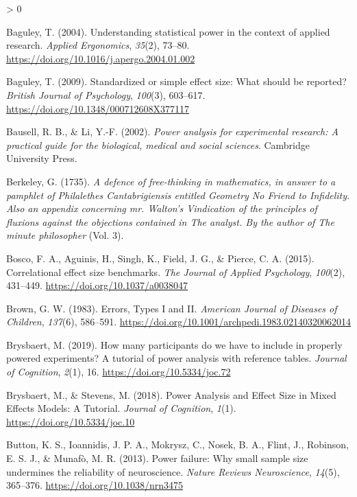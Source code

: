 \documentclass[
  english,
  ,jou, a4paper,floatsintext]{apa6}
\newlength{\cslhangindent}
\newenvironment{CSLReferences}[2] %
 {%
  \setlength{\parindent}{0pt}
  \ifodd #1 \everypar{\setlength{\hangindent}{\cslhangindent}}\ignorespaces\fi
  \ifnum #2 > 0
  \setlength{\parskip}{#2\baselineskip}
  \fi
 }%
 {}
\begin{document}
\begin{CSLReferences}{1}{0}
\leavevmode\hypertarget{ref-baguley_understanding_2004}{}%
Baguley, T. (2004). Understanding statistical power in the context of applied research. \emph{Applied Ergonomics}, \emph{35}(2), 73--80. \url{https://doi.org/10.1016/j.apergo.2004.01.002}

\leavevmode\hypertarget{ref-baguley_standardized_2009}{}%
Baguley, T. (2009). Standardized or simple effect size: What should be reported? \emph{British Journal of Psychology}, \emph{100}(3), 603--617. \url{https://doi.org/10.1348/000712608X377117}

\leavevmode\hypertarget{ref-bausell_power_2002}{}%
Bausell, R. B., \& Li, Y.-F. (2002). \emph{Power analysis for experimental research: A practical guide for the biological, medical and social sciences}. {Cambridge University Press}.

\leavevmode\hypertarget{ref-berkeley_defence_1735}{}%
Berkeley, G. (1735). \emph{A defence of free-thinking in mathematics, in answer to a pamphlet of {Philalethes Cantabrigiensis} entitled {Geometry No Friend} to {Infidelity}. {Also} an appendix concerning mr. {Walton}'s {Vindication} of the principles of fluxions against the objections contained in {The} analyst. {By} the author of {The} minute philosopher} (Vol. 3).

\leavevmode\hypertarget{ref-bosco_correlational_2015}{}%
Bosco, F. A., Aguinis, H., Singh, K., Field, J. G., \& Pierce, C. A. (2015). Correlational effect size benchmarks. \emph{The Journal of Applied Psychology}, \emph{100}(2), 431--449. \url{https://doi.org/10.1037/a0038047}

\leavevmode\hypertarget{ref-brown_errors_1983}{}%
Brown, G. W. (1983). Errors, {Types I} and {II}. \emph{American Journal of Diseases of Children}, \emph{137}(6), 586--591. \url{https://doi.org/10.1001/archpedi.1983.02140320062014}

\leavevmode\hypertarget{ref-brysbaert_how_2019-1}{}%
Brysbaert, M. (2019). How many participants do we have to include in properly powered experiments? A tutorial of power analysis with reference tables. \emph{Journal of Cognition}, \emph{2}(1), 16. \url{https://doi.org/10.5334/joc.72}

\leavevmode\hypertarget{ref-brysbaert_power_2018}{}%
Brysbaert, M., \& Stevens, M. (2018). Power {Analysis} and {Effect Size} in {Mixed Effects Models}: A {Tutorial}. \emph{Journal of Cognition}, \emph{1}(1). \url{https://doi.org/10.5334/joc.10}

\leavevmode\hypertarget{ref-button_power_2013}{}%
Button, K. S., Ioannidis, J. P. A., Mokrysz, C., Nosek, B. A., Flint, J., Robinson, E. S. J., \& Munafò, M. R. (2013). Power failure: Why small sample size undermines the reliability of neuroscience. \emph{Nature Reviews Neuroscience}, \emph{14}(5), 365--376. \url{https://doi.org/10.1038/nrn3475}


\end{CSLReferences}
\end{document}
